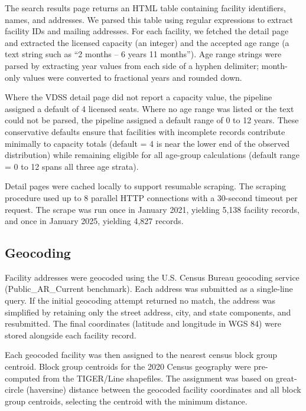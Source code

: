 \documentclass{CUP-JNL-DAP}%
\begin{document}
The search results page returns an HTML table containing facility identifiers, names, and addresses. We parsed this table using regular expressions to extract facility IDs and mailing addresses. For each facility, we fetched the detail page and extracted the licensed capacity (an integer) and the accepted age range (a text string such as ``2 months -- 6 years 11 months''). Age range strings were parsed by extracting year values from each side of a hyphen delimiter; month-only values were converted to fractional years and rounded down.

Where the VDSS detail page did not report a capacity value, the pipeline assigned a default of 4 licensed seats. Where no age range was listed or the text could not be parsed, the pipeline assigned a default range of 0 to 12 years. These conservative defaults ensure that facilities with incomplete records contribute minimally to capacity totals (default = 4 is near the lower end of the observed distribution) while remaining eligible for all age-group calculations (default range = 0 to 12 spans all three age strata).

Detail pages were cached locally to support resumable scraping. The scraping procedure used up to 8 parallel HTTP connections with a 30-second timeout per request. The scrape was run once in January 2021, yielding 5,138 facility records, and once in January 2025, yielding 4,827 records.

\subsection{Geocoding}

Facility addresses were geocoded using the U.S. Census Bureau geocoding service (Public\_AR\_Current benchmark)\citep{census_geocoder}. Each address was submitted as a single-line query. If the initial geocoding attempt returned no match, the address was simplified by retaining only the street address, city, and state components, and resubmitted. The final coordinates (latitude and longitude in WGS 84) were stored alongside each facility record.

Each geocoded facility was then assigned to the nearest census block group centroid. Block group centroids for the 2020 Census geography were pre-computed from the TIGER/Line shapefiles. The assignment was based on great-circle (haversine) distance between the geocoded facility coordinates and all block group centroids, selecting the centroid with the minimum distance.
\end{document}
